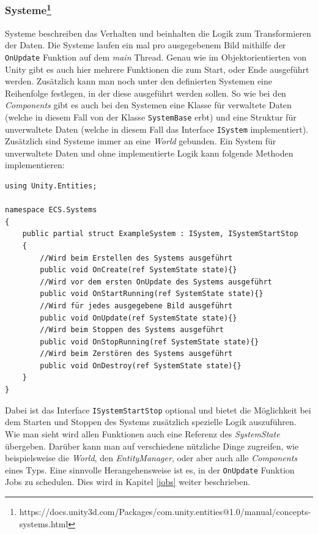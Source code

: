 \subsubsection{Systeme\footnote{https://docs.unity3d.com/Packages/com.unity.entities@1.0/manual/concepts-systems.html}}
Systeme beschreiben das Verhalten und beinhalten die Logik zum Transformieren der Daten. Die Systeme laufen ein mal pro ausgegebenem Bild mithilfe der \texttt{OnUpdate} Funktion auf dem \textit{main} Thread. Genau wie im Objektorientierten von Unity gibt es auch hier mehrere Funktionen die zum Start, oder Ende ausgeführt werden. Zusätzlich kann man noch unter den definierten Systemen eine Reihenfolge festlegen, in der diese ausgeführt werden sollen. So wie bei den \textit{Components} gibt es auch bei den Systemen eine Klasse für verwaltete Daten (welche in diesem Fall von der Klasse \texttt{SystemBase} erbt) und eine Struktur für unverwaltete Daten (welche in diesem Fall das Interface \texttt{ISystem} implementiert). Zusätzlich sind Systeme immer an eine \textit{World} gebunden. Ein System für unverwaltete Daten und ohne implementierte Logik kann folgende Methoden implementieren:
\begin{lstlisting}[style=code, caption={System Beispiel}]
using Unity.Entities;

namespace ECS.Systems
{
    public partial struct ExampleSystem : ISystem, ISystemStartStop
    {
        //Wird beim Erstellen des Systems ausgeführt
        public void OnCreate(ref SystemState state){}
        //Wird vor dem ersten OnUpdate des Systems ausgeführt
        public void OnStartRunning(ref SystemState state){}
        //Wird für jedes ausgegebene Bild ausgeführt
        public void OnUpdate(ref SystemState state){}
        //Wird beim Stoppen des Systems ausgeführt
        public void OnStopRunning(ref SystemState state){}
        //Wird beim Zerstören des Systems ausgeführt
        public void OnDestroy(ref SystemState state){}
    }
}
\end{lstlisting}
Dabei ist das Interface \texttt{ISystemStartStop} optional und bietet die Möglichkeit bei dem Starten und Stoppen des Systems zusätzlich spezielle Logik auszuführen. Wie man sieht wird allen Funktionen auch eine Referenz des \textit{SystemState} übergeben. Darüber kann man auf verschiedene nützliche Dinge zugreifen, wie beispielsweise die \textit{World}, den \textit{EntityManager}, oder aber auch alle \textit{Components} eines Typs. Eine sinnvolle Herangehensweise ist es, in der \texttt{OnUpdate} Funktion Jobs zu schedulen. Dies wird in Kapitel \ref{jobs} weiter beschrieben.
